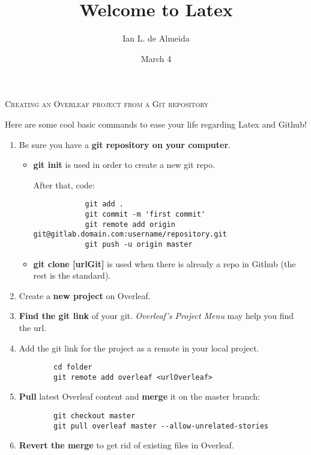\documentclass[10pt, twocolumn]{article}
\begin{document}
\title{Welcome to Latex}
\author{Ian L. de Almeida}
\date{March 4}

\maketitle 
\textsc{Creating an Overleaf project from a Git repository}
\par\par Here are some cool basic commands to ease your life regarding Latex and Github! 
    
\begin{enumerate}
    \item Be sure you have a \textbf{git repository on your computer}.
    \begin{itemize}
        \item \textbf{git init} is used in order to create a new git repo.
        \par After that, code:
        \par \begin{verbatim}
            git add .
            git commit -m 'first commit'
            git remote add origin git@gitlab.domain.com:username/repository.git
            git push -u origin master
        \end{verbatim}      
        \item \textbf{git clone  [urlGit]} is used when there is already a repo in Github (the rest is the standard).
    \end{itemize}
    \item Create a \textbf{new project} on Overleaf.
    \item \textbf{Find the git link} of your git. \textit{Overleaf's Project Menu} may help you find the url.
    \item Add the git link for the project as a remote in your local project. 
    \begin{verbatim}
        cd folder
        git remote add overleaf <urlOverleaf>
    \end{verbatim}
    \item \textbf{Pull} latest Overleaf content and \textbf{merge} it on the master branch:
    \begin{verbatim}
        git checkout master
        git pull overleaf master --allow-unrelated-stories
    \end{verbatim}
    \item \textbf{Revert the merge} to get rid of existing files in Overleaf.
    \begin{verbatim}

\end{verbatim}
\end{enumerate}
\end{document}
